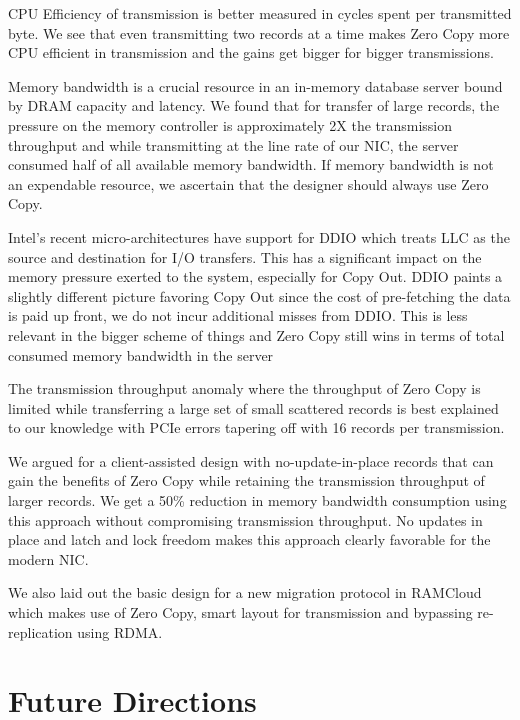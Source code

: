 CPU Efficiency of transmission is better measured in cycles spent per transmitted byte. We see that even transmitting two records at a time makes 
Zero Copy more CPU efficient in transmission and the gains get bigger for bigger transmissions.

Memory bandwidth is a crucial resource in an in-memory database server bound by DRAM capacity and latency. We found that for transfer of large 
records, the pressure on the memory controller is approximately 2X the transmission throughput and while transmitting at the line rate of our NIC, 
the server consumed half of all available memory bandwidth. If memory bandwidth is not an expendable resource, we ascertain that the designer should 
always use Zero Copy.
  
Intel\textregistered's recent micro-architectures have support for DDIO which treats LLC as the source and destination for I/O transfers. This has a significant impact on 
the memory pressure exerted to the system, especially for Copy Out. DDIO paints a slightly different picture favoring Copy Out since the cost of pre-fetching the data is 
paid up front, we do not incur additional misses from DDIO. This is less relevant in the bigger scheme of things and Zero Copy still wins in terms of total 
consumed memory bandwidth in the server
  
The transmission throughput anomaly where the throughput of Zero Copy is limited while transferring a large set of small scattered records is best explained to 
our knowledge with PCIe errors tapering off with 16 records per transmission.
 
We argued for a client-assisted design with no-update-in-place records that can gain the benefits of Zero Copy while retaining the transmission throughput of larger records. 
We get a 50\% reduction in memory bandwidth consumption using this approach without compromising transmission throughput. 
No updates in place and latch and lock freedom makes this approach clearly favorable for the modern NIC. 

We also laid out the basic design for a new migration protocol in RAMCloud which makes use of Zero Copy, smart layout for transmission and bypassing re-replication using 
RDMA.

\section{Future Directions}


